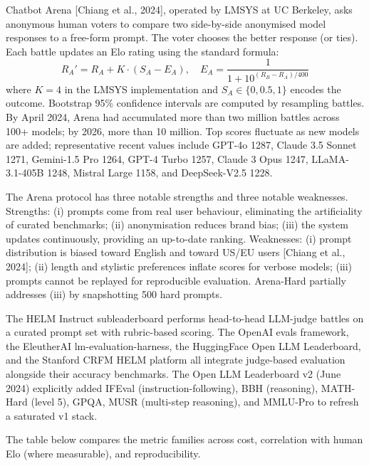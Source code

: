 Chatbot Arena {[}Chiang et al., 2024{]}, operated by LMSYS at UC Berkeley, asks anonymous human voters to compare two side-by-side anonymised model responses to a free-form prompt. The voter chooses the better response (or ties). Each battle updates an Elo rating using the standard formula:
\[R_A' = R_A + K \cdot (S_A - E_A), \quad E_A = \frac{1}{1 + 10^{(R_B - R_A)/400}}\]
where \(K=4\) in the LMSYS implementation and \(S_A \in \{0, 0.5, 1\}\) encodes the outcome. Bootstrap 95\% confidence intervals are computed by resampling battles. By April 2024, Arena had accumulated more than two million battles across 100+ models; by 2026, more than 10 million. Top scores fluctuate as new models are added; representative recent values include GPT-4o 1287, Claude 3.5 Sonnet 1271, Gemini-1.5 Pro 1264, GPT-4 Turbo 1257, Claude 3 Opus 1247, LLaMA-3.1-405B 1248, Mistral Large 1158, and DeepSeek-V2.5 1228.

The Arena protocol has three notable strengths and three notable weaknesses. Strengths: (i) prompts come from real user behaviour, eliminating the artificiality of curated benchmarks; (ii) anonymisation reduces brand bias; (iii) the system updates continuously, providing an up-to-date ranking. Weaknesses: (i) prompt distribution is biased toward English and toward US/EU users {[}Chiang et al., 2024{]}; (ii) length and stylistic preferences inflate scores for verbose models; (iii) prompts cannot be replayed for reproducible evaluation. Arena-Hard partially addresses (iii) by snapshotting 500 hard prompts.

The HELM Instruct subleaderboard performs head-to-head LLM-judge battles on a curated prompt set with rubric-based scoring. The OpenAI evals framework, the EleutherAI lm-evaluation-harness, the HuggingFace Open LLM Leaderboard, and the Stanford CRFM HELM platform all integrate judge-based evaluation alongside their accuracy benchmarks. The Open LLM Leaderboard v2 (June 2024) explicitly added IFEval (instruction-following), BBH (reasoning), MATH-Hard (level 5), GPQA, MUSR (multi-step reasoning), and MMLU-Pro to refresh a saturated v1 stack.

The table below compares the metric families across cost, correlation with human Elo (where measurable), and reproducibility.

